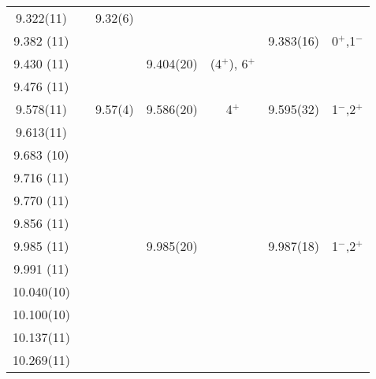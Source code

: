 \begin{center}
\begin{longtable}{cc c cc cc}
   9.322(11)    &       &     9.32(6)       &                   &                   &                   &                   \\
  9.382 (11)    &       &                   &                   &                   &    9.383(16)      &  0$^+$,1$^-$      \\
  9.430 (11)    &       &                   &     9.404(20)     & (4$^+$), 6$^+$    &                   &                   \\
  9.476 (11)    &       &                   &                   &                   &                   &                   \\
   9.578(11)    &       &     9.57(4)       &    9.586(20)      &   4$^+$           &   9.595(32)       &  1$^-$,2$^+$      \\
   9.613(11)    &       &                   &                   &                   &                   &                   \\
  9.683 (10)    &       &                   &                   &                   &                   &                   \\
  9.716 (11)    &       &                   &                   &                   &                   &                   \\
  9.770 (11)    &       &                   &                   &                   &                   &                   \\
  9.856 (11)    &       &                   &                   &                   &                   &                   \\
  9.985 (11)    &       &                   &     9.985(20)     &                   &    9.987(18)      & 1$^-$,2$^+$       \\
  9.991 (11)    &       &                   &                   &                   &                   &                   \\
  10.040(10)    &       &                   &                   &                   &                   &                   \\
  10.100(10)    &       &                   &                   &                   &                   &                   \\
  10.137(11)    &       &                   &                   &                   &                   &                   \\
  10.269(11)    &       &                   &                   &                   &                   &                   \\

\end{longtable}
\end{center}
